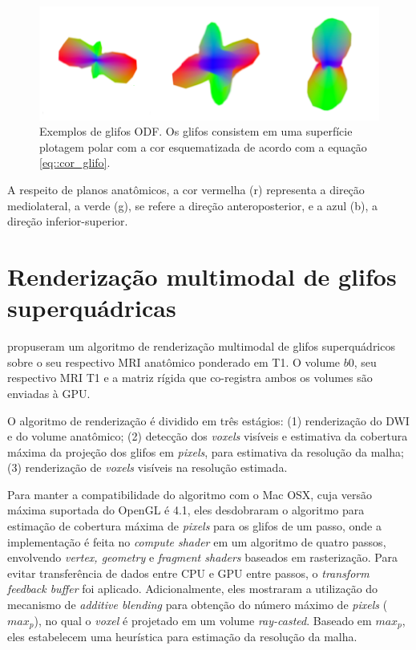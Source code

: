 \documentclass[
    12pt,                %
    oneside,            %
    a4paper,            %
    english,            %
    french,                %
    spanish,            %
    brazil                %
    ]{abntex2}
\begin{document}
\begin{figure}[ht]

    \centering
    \includegraphics[width=.8\linewidth, angle=0]{figs/Esquema_Glifo/Glifos3Ex.png}
    \caption{Exemplos de glifos ODF. Os glifos consistem em uma superfície plotagem polar com a cor esquematizada de acordo com a equação \ref{eq::cor_glifo}.}
    \label{fig::glifo_ilustrado}
   \hspace{1pt}
\end{figure}

A respeito de planos anatômicos, a cor vermelha (r) representa a direção mediolateral, a verde (g), se refere a direção anteroposterior, e a azul (b), a direção inferior-superior.

\section{Renderização multimodal de glifos superquádricas}
\label{sec::superquadricas}

 propuseram um algoritmo de renderização multimodal de glifos superquádricos sobre o seu respectivo MRI anatômico ponderado em T1. O volume $b0$, seu respectivo MRI T1 e a matriz rígida que co-registra ambos os volumes \cite{ting2014} são enviadas à GPU.

O algoritmo de renderização é dividido em três estágios: (1) renderização do DWI e do volume anatômico; (2) detecção dos \textit{voxels} visíveis e estimativa da cobertura máxima da projeção dos glifos em \textit{pixels}, para estimativa da resolução da malha; (3) renderização de \textit{voxels} visíveis na resolução estimada.

Para manter a compatibilidade do algoritmo com o Mac OSX, cuja versão máxima suportada do OpenGL é 4.1, eles desdobraram o algoritmo para estimação de cobertura máxima de \textit{pixels} para os glifos de um passo, onde a implementação é feita no \textit{compute shader} em um algoritmo de quatro passos, envolvendo \textit{vertex, geometry} e \textit{fragment shaders} baseados em rasterização. Para evitar transferência de dados entre CPU e GPU entre passos, o \textit{transform feedback buffer} foi aplicado. Adicionalmente, eles mostraram a utilização do mecanismo de \textit{additive blending} para obtenção do número máximo de \textit{pixels} ($max_p$), no qual o \textit{voxel} é projetado em um volume \textit{ray-casted}. Baseado em $max_p$, eles estabelecem uma heurística para estimação da resolução da malha.
\end{document}
